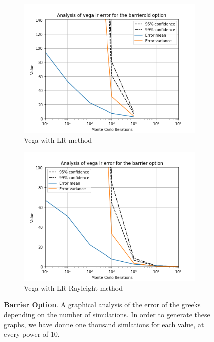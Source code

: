\documentclass[11pt,a4paper,fleqn]{article}
\begin{document}
\begin{figure}[h!]
      \begin{subfigure}[b]{0.45\textwidth}
          \includegraphics[width=\textwidth]{graphs/barrieroldvegalr.png}
          \caption{Vega with LR method}
      \end{subfigure}
      \begin{subfigure}[b]{0.45\textwidth}
          \includegraphics[width=\textwidth]{graphs/barriervegalr.png}
          \caption{Vega with LR Rayleight method}
      \end{subfigure}

      \caption{\textbf{Barrier Option}. A graphical analysis of the error of the greeks depending on the number of simulations. In order to generate these graphs, we have donne one thousand simlations for each value, at every power of 10.}
\end{figure}
\end{document}
